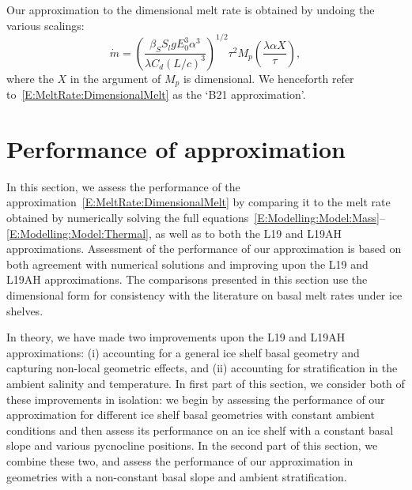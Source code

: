 \documentclass[openacc]{rsproca_new}%
\begin{document}
Our approximation to the dimensional melt rate is obtained by undoing the various scalings:
\begin{equation}\label{E:MeltRate:DimensionalMelt}
\dot{m} =\left(\frac{\beta_S S_l g  E_0^3 \alpha^3}{\lambda C_d (L/c)^3}\right)^{1/2} \tau^2  M_p\left(\frac{\lambda \alpha X}{\tau}\right),
\end{equation}
where the $X$ in the argument of $M_p$ is dimensional. We henceforth refer to~\eqref{E:MeltRate:DimensionalMelt} as the `B21 approximation'.

\section{Performance of approximation}\label{S:Numerics}
In this section, we assess the performance of the approximation~\eqref{E:MeltRate:DimensionalMelt} by comparing it to the melt rate obtained by numerically solving the full equations~\eqref{E:Modelling:Model:Mass}--\eqref{E:Modelling:Model:Thermal}, as well as to both the L19 and L19AH approximations. Assessment of the performance of our approximation is based on both agreement with numerical solutions and improving upon the L19 and L19AH approximations. The comparisons presented in this section use the dimensional form for consistency with the literature on basal melt rates under ice shelves.

In theory, we have made two improvements upon the L19 and L19AH approximations: (i) accounting for a general ice shelf basal geometry and capturing non-local geometric effects, and (ii) accounting for stratification in the ambient salinity and temperature. In first part of this section, we consider both of these improvements in isolation: we begin by assessing the performance of our approximation for different ice shelf basal geometries with constant ambient conditions and then assess its performance on an ice shelf with a constant basal slope and various pycnocline positions. In the second part of this section, we combine these two, and assess the performance of our approximation in geometries with a non-constant basal slope and ambient stratification.
\end{document}
